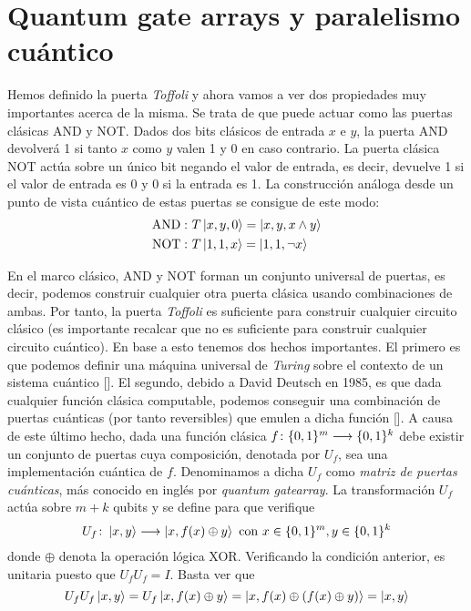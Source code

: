\section{Quantum gate arrays y paralelismo cuántico}\label{sec:sec49}
Hemos definido la puerta \textit{Toffoli} y ahora vamos a ver dos propiedades muy importantes acerca de la misma. Se trata de que puede actuar como las puertas clásicas AND y NOT. Dados dos bits clásicos de entrada $x$ e $y$, la puerta AND devolverá 1 si tanto $x$ como $y$ valen 1 y 0 en caso contrario. La puerta clásica NOT actúa sobre un único bit negando el valor de entrada, es decir, devuelve 1 si el valor de entrada es 0 y 0 si la entrada es 1. La construcción análoga desde un punto de vista cuántico de estas puertas se consigue de este modo:
\[
\begin{split}
\mathrm{AND:\ }&T\left|x,y,0\right\rangle=\left|x,y,x\wedge y\right\rangle\\
\mathrm{NOT:\ }&T\left|1,1,x\right\rangle=\left|1,1,\neg x\right\rangle
\end{split}
\]

En el marco clásico, AND y NOT forman un conjunto universal de puertas, es decir, podemos construir cualquier otra puerta clásica usando combinaciones de ambas. Por tanto, la puerta \textit{Toffoli} es suficiente para construir cualquier circuito clásico (es importante recalcar que no es suficiente para construir cualquier circuito cuántico). En base a esto tenemos dos hechos importantes. El primero es que podemos definir una máquina universal de \textit{Turing} sobre el contexto de un sistema cuántico [\cite{bernstein1997quantum}]. El segundo, debido a David Deutsch en 1985, es que dada cualquier función clásica computable, podemos conseguir una combinación de puertas cuánticas (por tanto reversibles) que emulen a dicha función [\cite{deutsch1985quantum}]. A causa de este último hecho, dada una función clásica $f\colon \{0,1\}^m\longrightarrow \{0,1\}^k$ debe existir un conjunto de puertas cuya composición, denotada por $U_f$, sea una implementación cuántica de $f$. Denominamos a dicha $U_f$ como \textit{matriz de puertas cuánticas}, más conocido en inglés por \textit{quantum gatearray}. La transformación $U_f$ actúa sobre $m+k$ qubits y se define para que verifique
\[U_f\colon \left|x,y\right\rangle\longrightarrow \left|x,f(x)\oplus y\right\rangle\mathrm{\ con\ }x\in\{0,1\}^m,y\in\{0,1\}^k\]
%
donde $\oplus$ denota la operación lógica XOR. Verificando la condición anterior, es unitaria puesto que $U_fU_f=I$. Basta ver que
\[U_fU_f\left|x,y\right\rangle=U_f\left|x,f(x)\oplus y\right\rangle=\left|x,f(x)\oplus(f(x)\oplus y)\right\rangle=\left|x,y\right\rangle
\]

